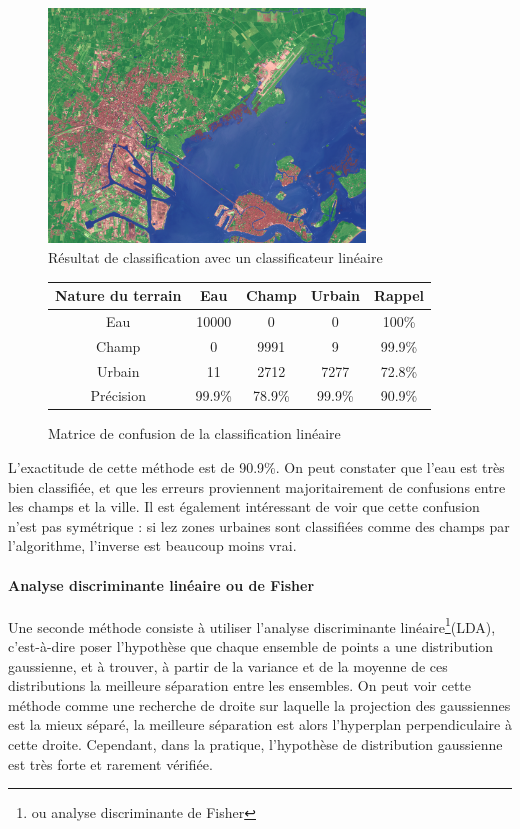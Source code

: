 \documentclass[a4paper,10pt]{report}
\begin{document}
\begin{figure}[H]
  \centering
    \includegraphics[width=0.75\textwidth]{veniseLSE}
  \caption{Résultat de classification avec un classificateur linéaire}
  \label{fig:veniseLSE}
\end{figure}

\begin{figure}[H]
\begin{center}
 \begin{tabular}{|c|c|c|c|c|}
  \hline
  Nature du terrain & Eau & Champ & Urbain & Rappel \\
  \hline
Eau & 10000   &   0    &   0 & 100\% \\
Champ & 0   &  9991     &   9  & 99.9\% \\
Urbain &  11   &     2712  &   7277 & 72.8\% \\
Précision & 99.9\%  & 78.9\% & 99.9\% & {\color{red}90.9\%} \\
  \hline
\end{tabular}
\end{center}
\caption{Matrice de confusion de la classification linéaire}
\label{table:confLSE}
\end{figure}

L'exactitude de cette méthode est de 90.9\%. On peut constater que l'eau est très bien classifiée, et que les erreurs proviennent majoritairement de confusions entre les champs et la ville. Il est également intéressant de voir que cette confusion n'est pas symétrique : si lez zones urbaines sont classifiées comme des champs par l'algorithme, l'inverse est beaucoup moins vrai.

\paragraph{Analyse discriminante linéaire ou de Fisher}
  Une seconde méthode consiste à utiliser l'analyse discriminante linéaire\footnote{ou analyse discriminante de Fisher}(LDA), c'est-à-dire poser l'hypothèse que chaque ensemble de points a une distribution gaussienne, et à trouver, à partir de la variance et de la moyenne de ces distributions la meilleure séparation entre les ensembles. On peut voir cette méthode comme une recherche de droite sur laquelle la projection des gaussiennes est la mieux séparé, la meilleure séparation est alors l'hyperplan perpendiculaire à cette droite. Cependant, dans la pratique, l'hypothèse de distribution gaussienne est très forte et rarement vérifiée.
\end{document}

